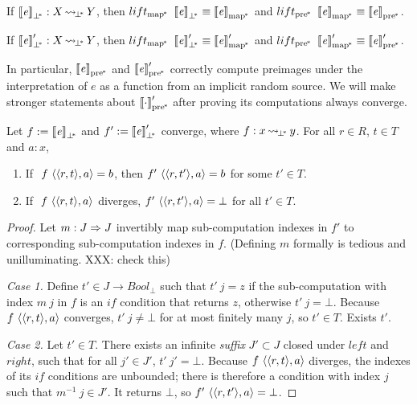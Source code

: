 \documentclass[preprint]{sigplanconf}
\newcommand{\arrow}{\rightsquigarrow}
\newcommand{\arrowlift}{\ensuremath{lift}}
\newcommand{\pbot}{{\bot^{\mspace{-4mu}*}}}
\DeclareMathOperator{\pbotto}{\arrow_{\mspace{-3mu}\pbot}}
\newcommand{\pmap}{_\mathrm{map^{\mspace{-2mu}*}}}
\newcommand{\liftpmap}{\arrowlift\pmap}
\newcommand{\ppre}{_\mathrm{pre^{\mspace{-2mu}*}}}
\newcommand{\liftppre}{\arrowlift\ppre}
\begin{document}
\begin{corollary}
If $\meaningof{\mathit{e}}_\pbot : X \pbotto Y$, then $\liftpmap~\meaningof{\mathit{e}}_\pbot \equiv \meaningof{\mathit{e}}\pmap$ and $\liftppre~\meaningof{\mathit{e}}\pmap \equiv \meaningof{\mathit{e}}\ppre$.
\end{corollary}

\begin{corollary}
If $\meaningof{\mathit{e}}_\pbot' : X \pbotto Y$, then $\liftpmap~\meaningof{\mathit{e}}_\pbot' \equiv \meaningof{\mathit{e}}\pmap'$ and $\liftppre~\meaningof{\mathit{e}}\pmap' \equiv \meaningof{\mathit{e}}\ppre'$.
\end{corollary}

In particular, $\meaningof{\mathit{e}}\ppre$ and $\meaningof{\mathit{e}}\ppre'$ correctly compute preimages under the interpretation of $\mathit{e}$ as a function from an implicit random source.
We will make stronger statements about $\meaningof{\cdot}\ppre'$ after proving its computations always converge.

\begin{theorem}
Let $f := \meaningof{\mathit{e}}_\pbot$ and $f' := \meaningof{\mathit{e}}_\pbot'$ converge, where $f : x \pbotto y$.
For all $r \in R$, $t \in T$ and $a : x$,
\begin{enumerate}
	\item If $~f~\langle{\langle{r,t}\rangle,a}\rangle = b$, then $f'~\langle{\langle{r,t'}\rangle,a}\rangle = b$ for some $t' \in T$.
	\item If $~f~\langle{\langle{r,t}\rangle,a}\rangle$ diverges, $f'~\langle{\langle{r,t'}\rangle,a}\rangle = \bot$ for all $t' \in T$.
\end{enumerate}
\end{theorem}
\begin{proof}
Let $m : J \Rightarrow J$ invertibly map sub-computation indexes in $f'$ to corresponding sub-computation indexes in $f$.
(Defining $m$ formally is tedious and unilluminating. XXX: check this)

\emph{Case 1.}
Define $t' \in J \to Bool_\bot$ such that $t'~j = z$ if the sub-computation with index $m~j$ in $f$ is an $if$ condition that returns $z$, otherwise $t'~j = \bot$.
Because $f~\langle{\langle{r,t}\rangle,a}\rangle$ converges, $t'~j \neq \bot$ for at most finitely many $j$, so $t' \in T$.
Exists $t'$.

\emph{Case 2.}
Let $t' \in T$.
There exists an infinite \emph{suffix} $J' \subset J$ closed under $left$ and $right$, such that for all $j' \in J'$, $t'~j' = \bot$.
Because $f~\langle{\langle{r,t}\rangle,a}\rangle$ diverges, the indexes of its $if$ conditions are unbounded; there is therefore a condition with index $j$ such that $m^{-1}~j \in J'$.
It returns $\bot$, so $f'~\langle{\langle{r,t'}\rangle,a}\rangle = \bot$.
\end{proof}
\end{document}
